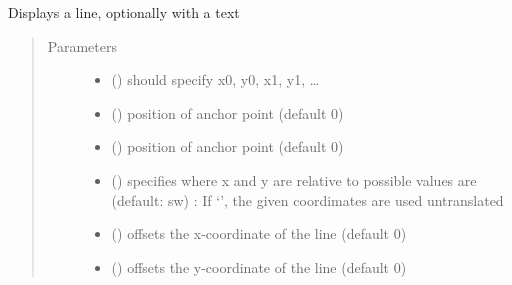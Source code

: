 \documentclass[letterpaper,10pt,english]{sphinxmanual}
\begin{document}
\begin{fulllineitems}
\label{\detokenize{Reference:salabim.AnimateLine}}
Displays a line, optionally with a text
\begin{quote}\begin{description}
\item[{Parameters}] \leavevmode\begin{itemize}
\item {} 
 () \textendash{} should specify x0, y0, x1, y1, …

\item {} 
 () \textendash{} position of anchor point (default 0)

\item {} 
 () \textendash{} position of anchor point (default 0)

\item {} 
 () \textendash{} specifies where x and y are relative to 
possible values are (default: sw) : 
If ‘’, the given coordimates are used untranslated

\item {} 
 () \textendash{} offsets the x-coordinate of the line (default 0)

\item {} 
 () \textendash{} offsets the y-coordinate of the line (default 0)


\end{itemize}
\end{description}
\end{quote}
\end{fulllineitems}
\end{document}
